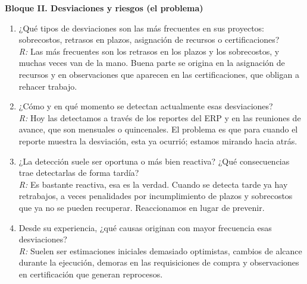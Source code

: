 \documentclass{univalle-perfil}
\begin{document}
\noindent\textbf{Bloque II. Desviaciones y riesgos (el problema)}
\begin{enumerate}\setlength{\itemsep}{6pt}\setlength{\parskip}{0pt}
  \item ¿Qué tipos de desviaciones son las más frecuentes en sus proyectos: sobrecostos, retrasos en plazos, asignación de recursos o certificaciones?\\
  \textit{R:} Las más frecuentes son los retrasos en los plazos y los sobrecostos, y muchas veces van de la mano. Buena parte se origina en la asignación de recursos y en observaciones que aparecen en las certificaciones, que obligan a rehacer trabajo.

  \item ¿Cómo y en qué momento se detectan actualmente esas desviaciones?\\
  \textit{R:} Hoy las detectamos a través de los reportes del ERP y en las reuniones de avance, que son mensuales o quincenales. El problema es que para cuando el reporte muestra la desviación, esta ya ocurrió; estamos mirando hacia atrás.

  \item ¿La detección suele ser oportuna o más bien reactiva? ¿Qué consecuencias trae detectarlas de forma tardía?\\
  \textit{R:} Es bastante reactiva, esa es la verdad. Cuando se detecta tarde ya hay retrabajos, a veces penalidades por incumplimiento de plazos y sobrecostos que ya no se pueden recuperar. Reaccionamos en lugar de prevenir.

  \item Desde su experiencia, ¿qué causas originan con mayor frecuencia esas desviaciones?\\
  \textit{R:} Suelen ser estimaciones iniciales demasiado optimistas, cambios de alcance durante la ejecución, demoras en las requisiciones de compra y observaciones en certificación que generan reprocesos.
\end{enumerate}
\end{document}
